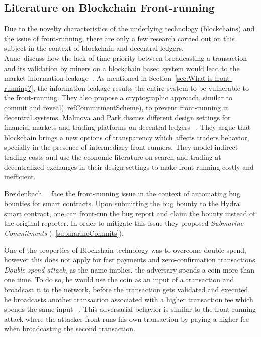 \subsection{Literature on Blockchain Front-running}

Due to the novelty characteristics of the underlying technology (blockchains) and the issue of front-running, there are only a few research carried out on this subject in the context of blockchain and decentral ledgers. \\
Aune~\etal discuss how the lack of time priority between broadcasting a transaction and its validation by miners on a blockchain based system would lead to the market information leakage~\cite{aune2017footprints}. As mentioned in Section~\ref{sec:What is front-running?}, the information leakage results the entire system to be vulnerable to the front-running. They also propose a cryptographic approach, similar to commit and reveal(~ref{CommitmentScheme}), to prevent front-running in decentral systems. %
Malinova and Park discuss different design settings for financial markets and trading platforms on decentral ledgers ~\cite{malinova2017market}.  They argue that blockchain brings a new options of transparency which affects traders behavior, specially in the presence of intermediary front-runners. They model indirect trading costs and use the economic literature on search and trading at decentralized exchanges in their design settings to make front-running costly and inefficient.

Breidenbach~\etal~\cite{breidenbach2018enter} face the front-running issue in the context of automating bug bounties for smart contracts. Upon submitting the bug bounty to the Hydra smart contract, one can front-run the bug report and claim the bounty instead of the original reporter. In order to mitigate this issue they proposed \textit{Submarine Commitments} (~\ref{submarineCommits}).

One of the properties of Blockchain technology was to overcome double-spend, however this does not apply for fast payments and zero-confirmation transactions. \textit{Double-spend attack}, as the name implies, the adversary spends a coin more than one time. To do so, he would use the coin as an input of a transaction and broadcast it to the network, before the transaction gets validated and executed, he broadcasts another transaction associated with a higher transaction fee which spends the same input ~\cite{bamert2013have, karame2012double}. This adversarial behavior is similar to the front-running attack where the attacker front-runs his own transaction by paying a higher fee when broadcasting the second transaction.

